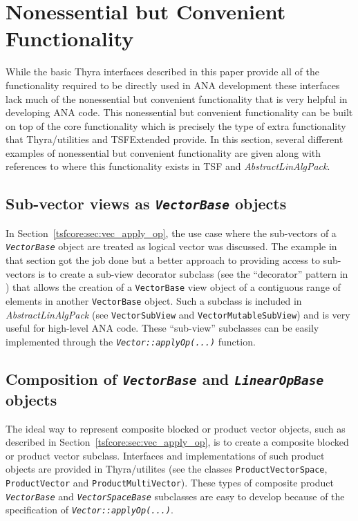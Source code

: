 \documentclass[pdf,ps2pdf,11pt]{SANDreport}
\begin{document}
%
\section{Nonessential but Convenient Functionality}
\label{tsfcore:sec:convenience_functionality}
%

While the basic Thyra interfaces described in this paper provide all
of the functionality required to be directly used in ANA development
these interfaces lack much of the nonessential but convenient
functionality that is very helpful in developing ANA code.  This
nonessential but convenient functionality can be built on top of the
core functionality which is precisely the type of extra functionality
that Thyra/utilities and TSFExtended provide.  In this section,
several different examples of nonessential but convenient
functionality are given along with references to where this
functionality exists in TSF and {}\textit{AbstractLinAlgPack}.

%
\subsection{Sub-vector views as {}\texttt{\textit{Vector\-Base}} objects}
%

In Section~\ref{tsfcore:sec:vec_apply_op}, the use case where the sub-vectors
of a {}\texttt{\textit{Vector\-Base}} object are treated as logical vector was
discussed.  The example in that section got the job done but a better approach
to providing access to sub-vectors is to create a sub-view decorator subclass
(see the ``decorator'' pattern in {}\cite{ref:gama_et_al_1995}) that allows
the creation of a {}\texttt{Vector\-Base} view object of a contiguous range of
elements in another {}\texttt{Vector\-Base} object.  Such a subclass is
included in {}\textit{AbstractLinAlgPack} (see {}\texttt{VectorSubView} and
{}\texttt{Vector\-Mutable\-Sub\-View}) and is very useful for high-level ANA
code.  These ``sub-view'' subclasses can be easily implemented through the
{}\texttt{\textit{Vector\-::applyOp(\-...)}}  function.

%
\subsection{Composition of {}\texttt{\textit{Vector\-Base}} and {}\texttt{\textit{Linear\-Op\-Base}} objects}
\label{tsfcore:sec:composite_abstractions}
%

The ideal way to represent composite blocked or product vector objects, such
as described in Section~\ref{tsfcore:sec:vec_apply_op}, is to create a
composite blocked or product vector subclass.  Interfaces and implementations
of such product objects are provided in Thyra/utilites (see the classes
{}\texttt{Product\-Vector\-Space}, {}\texttt{Product\-Vector} and
{}\texttt{Product\-Multi\-Vector}).  These types of composite product
{}\texttt{\textit{Vector\-Base}} and {}\texttt{\textit{Vector\-Space\-Base}}
subclasses are easy to develop because of the specification of
{}\texttt{\textit{Vector\-::applyOp(\-...)}}.
\end{document}
